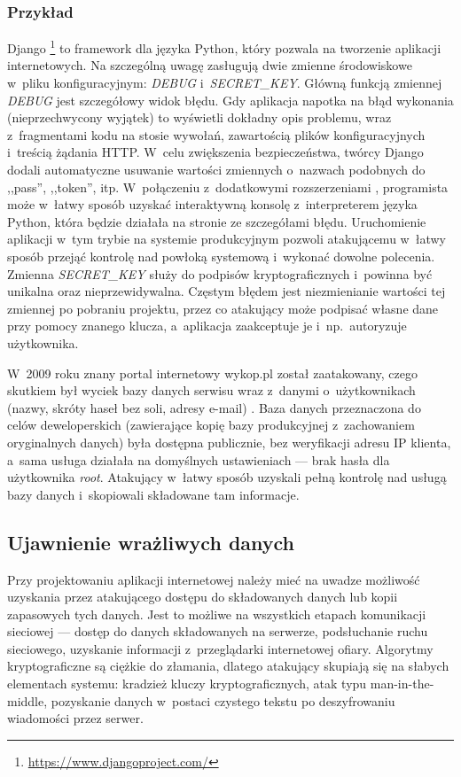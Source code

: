 \documentclass[12pt,a4paper,polish,thesis]{dcsbook}
\begin{document}
\subsubsection*{Przykład}
Django \footnote{\url{https://www.djangoproject.com/}} to framework dla języka Python, który pozwala na tworzenie aplikacji internetowych. Na szczególną uwagę zasługują dwie zmienne środowiskowe w~pliku konfiguracyjnym: \textit{DEBUG} i~\textit{SECRET\_KEY}. Główną funkcją zmiennej \textit{DEBUG} jest szczegółowy widok błędu. Gdy aplikacja napotka na błąd wykonania (nieprzechwycony wyjątek) to wyświetli dokładny opis problemu, wraz z~fragmentami kodu na stosie wywołań, zawartością plików konfiguracyjnych i~treścią żądania HTTP. W~celu zwiększenia bezpieczeństwa, twórcy Django dodali automatyczne usuwanie wartości zmiennych o~nazwach podobnych do ,,pass'', ,,token'', itp. W~połączeniu z~dodatkowymi rozszerzeniami \cite{werkzeug}, programista może w~łatwy sposób uzyskać interaktywną konsolę z~interpreterem języka Python, która będzie działała na stronie ze szczegółami błędu. Uruchomienie aplikacji w~tym trybie na systemie produkcyjnym pozwoli atakującemu w~łatwy sposób przejąć kontrolę nad powłoką systemową i~wykonać dowolne polecenia. Zmienna \textit{SECRET\_KEY} służy do podpisów kryptograficznych i~powinna być unikalna oraz nieprzewidywalna. Częstym błędem jest niezmienianie wartości tej zmiennej po pobraniu projektu, przez co atakujący może podpisać własne dane przy pomocy znanego klucza, a~aplikacja zaakceptuje je i~np.~autoryzuje użytkownika.

 W~2009 roku znany portal internetowy wykop.pl został zaatakowany, czego skutkiem był wyciek bazy danych serwisu wraz z~danymi o~użytkownikach (nazwy, skróty haseł bez soli, adresy e-mail) \cite{wykop}. Baza danych przeznaczona do celów deweloperskich (zawierające kopię bazy produkcyjnej z~zachowaniem oryginalnych danych) była dostępna publicznie, bez weryfikacji adresu IP klienta, a~sama usługa działała na domyślnych ustawieniach --- brak hasła dla użytkownika \textit{root}. Atakujący w~łatwy sposób uzyskali pełną kontrolę nad usługą bazy danych i~skopiowali składowane tam informacje.

\subsection{Ujawnienie wrażliwych danych}
Przy projektowaniu aplikacji internetowej należy mieć na uwadze możliwość uzyskania przez atakującego dostępu do składowanych danych lub kopii zapasowych tych danych. Jest to możliwe na wszystkich etapach komunikacji sieciowej --- dostęp do danych składowanych na serwerze, podsłuchanie ruchu sieciowego, uzyskanie informacji z~przeglądarki internetowej ofiary. Algorytmy kryptograficzne są ciężkie do złamania, dlatego atakujący skupiają się na słabych elementach systemu: kradzież kluczy kryptograficznych, atak typu man-in-the-middle, pozyskanie danych w~postaci czystego tekstu po deszyfrowaniu wiadomości przez serwer.
\end{document}
